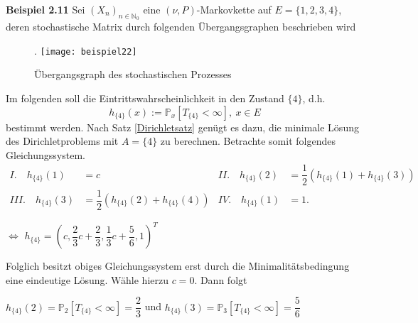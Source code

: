 \textbf{Beispiel 2.11}
Sei $(X_{n})_{n \in \mathbb{N}_{0}}$ eine $(\nu,P)$-Markovkette auf $E = \lbrace 1,2,3,4 \rbrace$, deren stochastische Matrix durch folgenden Übergangsgraphen beschrieben wird
\begin{figure}[H].
\centering
\texttt{[image: beispiel22]}
\caption{Übergangsgraph des stochastischen Prozesses}
\end{figure}
\noindent
Im folgenden soll die Eintrittswahrscheinlichkeit in den Zustand $\lbrace 4 \rbrace$, d.h.
\begin{equation*}
h_{\lbrace    4 \rbrace}(x) := \mathbb{P}_{x}[T_{\lbrace 4 \rbrace} < \infty], \: x \in E
\end{equation*}
bestimmt werden. Nach Satz \ref{Dirichletsatz} genügt es dazu, die minimale Lösung des Dirichletproblems mit $A=\lbrace 4 \rbrace$ zu berechnen. Betrachte somit folgendes Gleichungssystem.
\begin{align*}
     I. \quad h_{\lbrace 4 \rbrace}(1) &= c          & II. \quad h_{\lbrace 4 \rbrace}(2) &= \dfrac{1}{2}(h_{\lbrace 4 \rbrace}(1) + h_{\lbrace 4 \rbrace}(3))  \,  \\ 
  III. \quad h_{\lbrace 4 \rbrace}(3) &= \dfrac{1}{2}(h_{\lbrace 4 \rbrace}(2) + h_{\lbrace 4 \rbrace}(4))   & IV. \quad h_{\lbrace    4 \rbrace}(1) &= 1.
\end{align*}
\begin{center}
$\Leftrightarrow$ $h_{\lbrace 4 \rbrace} = (c, \dfrac{2}{3}c + \dfrac{2}{3}, \dfrac{1}{3}c + \dfrac{5}{6},1)^{T}$
\end{center}
Folglich besitzt obiges Gleichungssystem erst durch die Minimalitätsbedingung eine eindeutige Lösung. Wähle hierzu $c=0$. Dann folgt
\begin{center}
$h_{\lbrace 4 \rbrace}(2) = \mathbb{P}_{2}[T_{\lbrace 4 \rbrace} < \infty] = \dfrac{2}{3}$ und $h_{\lbrace 4 \rbrace}(3) = \mathbb{P}_{3}[T_{\lbrace 4 \rbrace} < \infty] = \dfrac{5}{6}$
\end{center}

